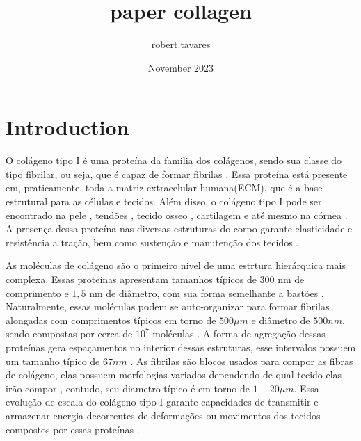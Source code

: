 \documentclass{article}
\title{paper collagen}
\author{robert.tavares}
\date{November 2023}
\begin{document}
\maketitle

\section{Introduction}

    O colágeno tipo I é uma proteína da familia dos colágenos, sendo sua classe do tipo fibrilar, ou seja, que é capaz de formar 
    fibrilas \cite{Silver2018}. Essa proteína	está presente em, praticamente, toda a matriz extracelular humana(ECM), que é 
    a base estrutural para as células e tecidos. Além disso, o colágeno tipo I pode ser encontrado na pele 
    \cite{Davison-Kotler2019-do}, tendões \cite{Tresoldi2013-qq}, tecido osseo \cite{FEDARKO201445, RicoLlanos2021}, cartilagem 
    \cite{Sophia_Fox2009-qd} e até mesmo na córnea \cite{CHEN201569}. A presença dessa proteína nas diversas estruturas do corpo 
    garante elasticidade e resistência a tração, bem como sustenção e manutenção dos tecidos \cite{Silver2018,Amirrah2022-uh}.  
    
    As moléculas de colágeno são o primeiro nivel de uma estrtura hierárquica mais complexa. Essas proteínas apresentam tamanhos
    típicos de $300$ nm de comprimento e $1,5$ nm de diâmetro, com sua forma semelhante a bastões \cite{Gelse2003,Silver2018}. 
    Naturalmente, essas moléculas podem se auto-organizar para formar fibrilas alongadas com comprimentos típicos em torno de 
    \(500 \mu m\) e diâmetro de \(500 nm\), sendo compostas por cerca de \(10^{7}\) moléculas \cite{Charvolin2019, KADLER1996, 
    Parry1984}. A forma de agregação dessas proteínas gera espaçamentos no interior dessas estruturas, esse intervalos possuem 
    um tamanho  típico de \(67 nm\) \cite{Zhu2018}. As fibrilas são blocos usados para compor as fibras de colágeno, elas possuem 
    morfologias variados dependendo de qual tecido elas irão compor \cite{Amirrah2022-uh}, contudo, seu diametro típico é em torno 
    de \(1-20 \mu m\). Essa evolução de escala do colágeno tipo I garante capacidades de transmitir e armazenar energia decorrentes
    de deformações ou movimentos dos tecidos compostos por essas proteínas \cite{Silver2008ViscoelasticityES}.
\end{document}
